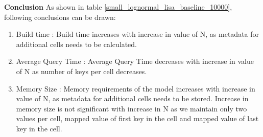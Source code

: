 \textbf{Conclusion} As shown in table \ref{small_lognormal_lisa_baseline_10000}, following conclusions can be drawn:
\begin{enumerate}
	\item Build time : Build time increases with increase in value of N, as metadata for additional cells needs to be calculated. 
	\item Average Query Time :  Average Query Time decreases with increase in value of N as number of keys per cell decreases.
	\item Memory Size :  Memory requirements of the model increases with increase in value of N, as metadata for additional cells needs to be stored. Increase  in memory size is not significant with increase in N as we maintain only two values per cell, mapped value of first key in the cell and mapped value of last key in the cell.
\end{enumerate}


